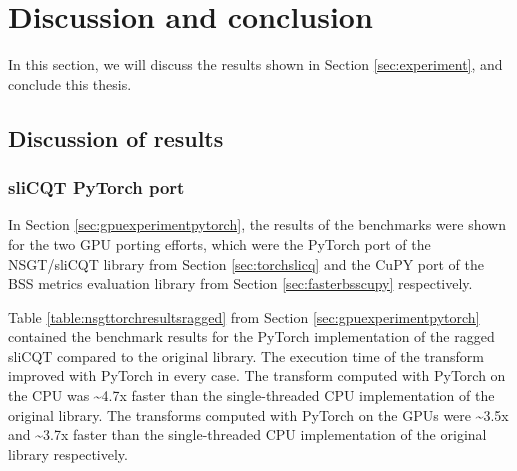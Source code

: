 \documentclass[report.tex]{subfiles}
\begin{document}
\section{Discussion and conclusion}
\label{sec:results}

In this section, we will discuss the results shown in Section \ref{sec:experiment}, and conclude this thesis.

\subsection{Discussion of results}
\label{sec:discussion}

\subsubsection{sliCQT PyTorch port}
\label{sec:gpuexperimentpytorchdiscuss}

In Section \ref{sec:gpuexperimentpytorch}, the results of the benchmarks were shown for the two GPU porting efforts, which were the PyTorch port of the NSGT/sliCQT library from Section \ref{sec:torchslicq} and the CuPY port of the BSS metrics evaluation library from Section \ref{sec:fasterbsscupy} respectively.

Table \ref{table:nsgttorchresultsragged} from Section \ref{sec:gpuexperimentpytorch} contained the benchmark results for the PyTorch implementation of the ragged sliCQT compared to the original library. The execution time of the transform improved with PyTorch in every case. The transform computed with PyTorch on the CPU was \textasciitilde4.7x faster than the single-threaded CPU implementation of the original library. The transforms computed with PyTorch on the GPUs were \textasciitilde3.5x and \textasciitilde3.7x faster than the single-threaded CPU implementation of the original library respectively.
\end{document}
